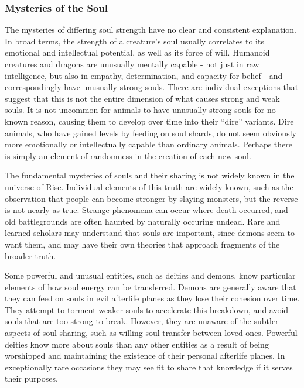        \subsubsection{Mysteries of the Soul}
            The mysteries of differing soul strength have no clear and consistent explanation.
            In broad terms, the strength of a creature's soul usually correlates to its emotional and intellectual potential, as well as its force of will.
            Humanoid creatures and dragons are unusually mentally capable - not just in raw intelligence, but also in empathy, determination, and capacity for belief - and correspondingly have unusually strong souls.
            There are individual exceptions that suggest that this is not the entire dimension of what causes strong and weak souls.
            It is not uncommon for animals to have unusually strong souls for no known reason, causing them to develop over time into their ``dire'' variants.
            Dire animals, who have gained levels by feeding on soul shards, do not seem obviously more emotionally or intellectually capable than ordinary animals.
            Perhaps there is simply an element of randomness in the creation of each new soul.

            The fundamental mysteries of souls and their sharing is not widely known in the universe of Rise.
            Individual elements of this truth are widely known, such as the observation that people can become stronger by slaying monsters, but the reverse is not nearly as true.
            Strange phenomena can occur where death occurred, and old battlegrounds are often haunted by naturally occuring undead.
            Rare and learned scholars may understand that souls are important, since demons seem to want them, and may have their own theories that approach fragments of the broader truth.

            Some powerful and unusual entities, such as deities and demons, know particular elements of how soul energy can be transferred.
            Demons are generally aware that they can feed on souls in evil afterlife planes as they lose their cohesion over time.
            They attempt to torment weaker souls to accelerate this breakdown, and avoid souls that are too strong to break.
            However, they are unaware of the subtler aspects of soul sharing, such as willing soul transfer between loved ones.
            Powerful deities know more about souls than any other entities as a result of being worshipped and maintaining the existence of their personal afterlife planes.
            In exceptionally rare occasions they may see fit to share that knowledge if it serves their purposes.

